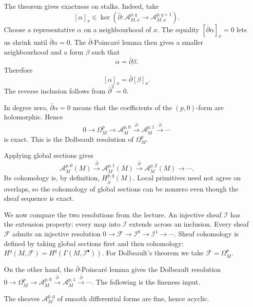 \noindent
The theorem gives exactness on stalks.
Indeed, take
$$
[\alpha]_x
\in
\ker\left(
\bar\partial:
\mathcal A^{p,q}_{M,x}
\to
\mathcal A^{p,q+1}_{M,x}
\right).
$$
Choose a representative $\alpha$ on a
neighbourhood of $x$. The equality
$[\bar\partial\alpha]_x=0$ lets us shrink
until $\bar\partial\alpha=0$. The
$\bar\partial$-Poincaré lemma then gives a
smaller neighbourhood and a form $\beta$
such that
$$
\alpha=\bar\partial\beta.
$$
Therefore
$$
[\alpha]_x=\bar\partial[\beta]_x.
$$
The reverse inclusion follows from
$\bar\partial^2=0$.

In degree zero,
$\bar\partial\alpha=0$ means that the
coefficients of the $(p,0)$-form are
holomorphic. Hence
$$
0\longrightarrow\Omega^p_M
\longrightarrow\mathcal A^{p,0}_M
\xrightarrow{\bar\partial}
\mathcal A^{p,1}_M
\xrightarrow{\bar\partial}\cdots
$$
is exact. This is the Dolbeault resolution
of $\Omega^p_M$.

Applying global sections gives
$$
\mathcal A^{p,0}_M(M)
\xrightarrow{\bar\partial}
\mathcal A^{p,1}_M(M)
\xrightarrow{\bar\partial}
\mathcal A^{p,2}_M(M)
\longrightarrow\cdots.
$$
Its cohomology is, by definition,
$H^{p,q}_{\bar\partial}(M)$.
Local primitives need not agree on overlaps,
so the cohomology of global sections can be
nonzero even though the sheaf sequence is
exact.

We now compare the two resolutions from
the lecture. An injective sheaf
$\mathcal I$ has the extension property:
every map into $\mathcal I$ extends across
an inclusion. Every sheaf $\mathcal F$
admits an injective resolution
$
0\longrightarrow\mathcal F
\longrightarrow\mathcal I^0
\longrightarrow\mathcal I^1
\longrightarrow\cdots.
$
Sheaf cohomology is defined by taking global
sections first and then cohomology:
$
H^q(M,\mathcal F)
=
H^q\left(
\Gamma(M,\mathcal I^\bullet)
\right).
$
For Dolbeault's theorem we take
$\mathcal F=\Omega^p_M$.

On the other hand, the
$\bar\partial$-Poincaré lemma gives the
Dolbeault resolution
$
0\longrightarrow\Omega^p_M
\longrightarrow\mathcal A^{p,0}_M
\xrightarrow{\bar\partial}
\mathcal A^{p,1}_M
\xrightarrow{\bar\partial}\cdots.
$
The following is the fineness input.

\begin{proposition}
\label{proposition-smooth-forms-fine}
\begin{reference}
\cite[Proposition 4.36]{voi}
\end{reference}
The sheaves $\mathcal A^{p,q}_M$ of smooth
differential forms are fine, hence acyclic.
\end{proposition}

